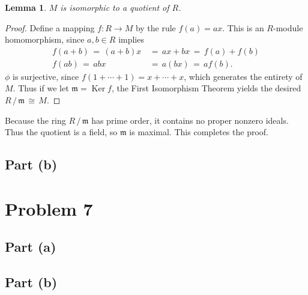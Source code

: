 \documentclass[11pt]{article}
\newtheorem{lemma}{Lemma}
\newcommand{\Ker}{\operatorname{Ker}}
\begin{document}
\begin{adjustwidth}{0.5cm}{}
  \begin{lemma}
    $M$ is isomorphic to a quotient of $R$.
  \end{lemma}
  \begin{proof}\renewcommand{\qedsymbol}{}
    Define a mapping $f : R \to M$ by the rule $f(a) = ax$. This is an $R$-module homomorphism, since $a, b \in R$ implies
    \begin{align*}
      f(a + b) \, = \, (a + b)x \, &= \, ax + bx \, = \, f(a) + f(b) \\
      f(ab) \, = \, abx \, &= \, a(bx) \, = \, a f(b).
    \end{align*}
    $\phi$ is surjective, since $f(1 + \cdots + 1) = x + \cdots + x$, which generates the entirety of $M$. Thus if we let $\mathfrak{m} = \Ker f$, the First Isomorphism Theorem yields the desired $R \, / \, \mathfrak{m} \, \cong \, M$.
  \end{proof}
\end{adjustwidth}

Because the ring $R \, / \, \mathfrak{m}$ has prime order, it contains no proper nonzero ideals. Thus the quotient is a field, so $\mathfrak{m}$ is maximal. This completes the proof.


\subsection{Part (b)}


\section{Problem 7}


\subsection{Part (a)}


\subsection{Part (b)}

\end{document}
